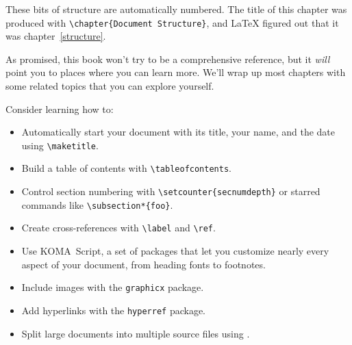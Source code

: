These bits of structure are automatically numbered.
The title of this chapter was produced with \verb|\chapter{Document Structure}|,
and \LaTeX{} figured out that it was chapter~\ref{structure}.

\exercises{}

As promised, this book won't try to be a comprehensive reference,
but it \emph{will} point you to places where you can learn more.
We'll wrap up most chapters with some related topics that you can
explore yourself.

Consider learning how to:
\begin{itemize}
\item Automatically start your document with its title, your name,
    and the date using \verb|\maketitle|.
\item Build a table of contents
    with \verb|\tableofcontents|.
\item Control section numbering with \verb|\setcounter{secnumdepth}|
or starred commands like \verb|\subsection*{foo}|.
\item Create cross-references with \verb|\label| and \verb|\ref|.
\item Use KOMA~Script, a set of packages that let you customize nearly every
    aspect of your document, from heading fonts to footnotes.
\item Include images with the \texttt{graphicx} package.
\item Add hyperlinks with the \texttt{hyperref} package.
\item Split large documents into multiple source files using \verb||.
\end{itemize}
